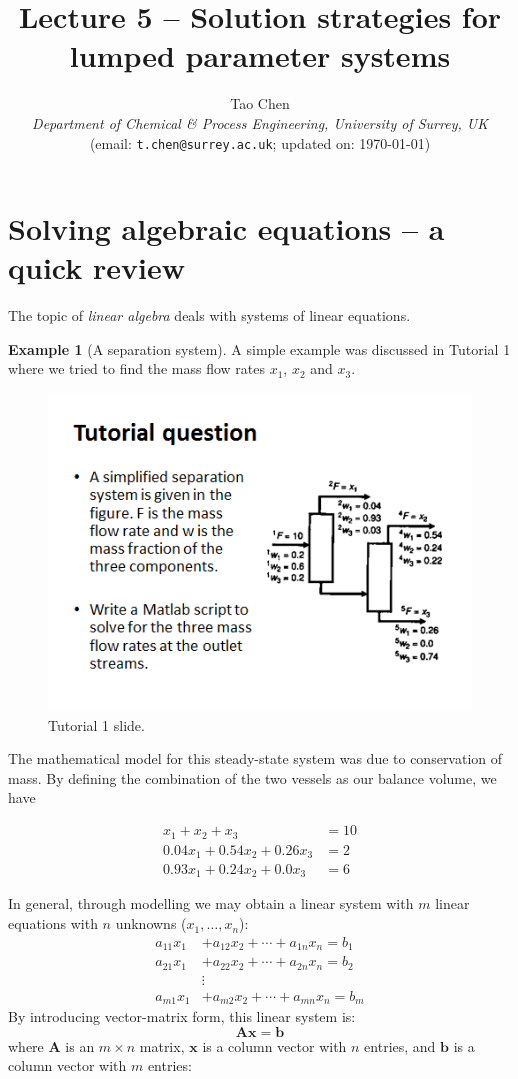 \documentclass[a4paper,11pt]{article}
\title{\vspace{-2cm} Lecture 5 -- Solution strategies for lumped parameter systems}
\author{Tao Chen\\
{\small \emph{Department of Chemical \& Process Engineering, University of Surrey, UK}}\\
{\small (email: \texttt{t.chen@surrey.ac.uk}; \hspace{0.5cm} updated on: \today )}
}
\date{}
\newcommand{\bm}{\mathbf}
\theoremstyle{definition}
\newtheorem{exmp}{Example}[section]
\begin{document}
\maketitle

\vspace{-0.5cm}

\section{Solving algebraic equations -- a quick review}
\label{sec:alg}

The topic of \emph{linear algebra} deals with systems of linear equations.

\begin{exmp}[A separation system]
\label{exmp:separ}
A simple example was discussed in Tutorial 1 where we tried to find the mass flow rates $x_1$,
$x_2$ and $x_3$.

\begin{figure}[!h]
 \begin{center}
	\includegraphics[width=.5\textwidth]{separ}
 \end{center}
 \caption{Tutorial 1 slide.} 
 \label{fig:separ}
\end{figure}


The mathematical model for this steady-state system was due to conservation of mass.
By defining the combination of the two vessels as our balance volume,
we have

\begin{align}
	x_1 + x_2 + x_3 &= 10 \\
	0.04 x_1 + 0.54 x_2 + 0.26 x_3 &= 2 \\
	0.93 x_1 + 0.24 x_2 + 0.0 x_3  &= 6
\end{align}

\end{exmp}

In general, through modelling we may obtain a linear system with $m$ linear equations with $n$ unknowns
($x_1, \ldots, x_n$):
\begin{align}
	a_{11} x_1 &+ a_{12} x_2 + \cdots + 	a_{1n} x_n = b_1 \\
	a_{21} x_1 &+ a_{22} x_2 + \cdots + 	a_{2n} x_n = b_2 \\	
	                 &\vdots \\
	a_{m1} x_1 &+ a_{m2} x_2 + \cdots + 	a_{mn} x_n = b_m
\end{align}
\noindent By introducing vector-matrix form, this linear system is:
\begin{equation}
	\bm{A x} = \bm b
\end{equation}
\noindent where $\bm A$ is an $m \times n$ matrix, $\bm x$ is a column vector with $n$ entries, and $\bm b$ is a column
vector with $m$ entries:
\end{document}
